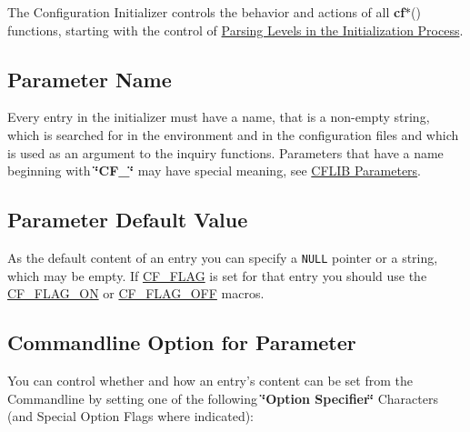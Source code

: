 The Configuration Initializer controls the behavior and actions of all {\bf cf$\ast$}() functions, starting with the control of \hyperlink{config_levels_initialization_process}{Parsing Levels in the Initialization Process}.\hypertarget{config_initializer_parameter_name}{}\subsection{Parameter Name}\label{config_initializer_parameter_name}
Every entry in the initializer must have a name, that is a non-empty string, which is searched for in the environment and in the configuration files and which is used as an argument to the inquiry functions. Parameters that have a name beginning with {\bf \char`\"{}CF\_\-\char`\"{}} may have special meaning, see \hyperlink{parameter_types_cflib_parameters}{CFLIB Parameters}.\hypertarget{config_initializer_parameter_default}{}\subsection{Parameter Default Value}\label{config_initializer_parameter_default}
As the default content of an entry you can specify a {\tt NULL} pointer or a string, which may be empty. If \hyperlink{group__special__options__mask_g1d1f1d1b6eac6b5d9970102318ab2667}{CF\_\-FLAG} is set for that entry you should use the \hyperlink{group__cflib__core_g355c714f2912ac336b8b03468c978d8c}{CF\_\-FLAG\_\-ON} or \hyperlink{group__cflib__core_g7010abac2c80c121772da4d9c03332ee}{CF\_\-FLAG\_\-OFF} macros.\hypertarget{config_initializer_parameter_option}{}\subsection{Commandline Option for Parameter}\label{config_initializer_parameter_option}
You can control whether and how an entry's content can be set from the Commandline by setting one of the following {\bf \char`\"{}Option Specifier\char`\"{}} Characters (and Special Option Flags where indicated):


